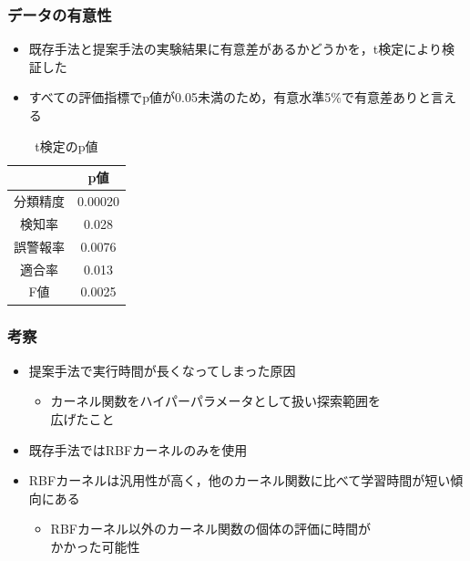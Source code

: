\documentclass[11pt,dvipdfmx,cjk]{beamer}
\begin{document}
\begin{frame}
  \frametitle{データの有意性}
  \begin{itemize}
    \item 既存手法と提案手法の実験結果に有意差があるかどうかを，t検定により検証した
    \item すべての評価指標でp値が0.05未満のため，有意水準5\%で有意差ありと言える
  \end{itemize}
  \begin{table}[b]
    \centering
    \caption{t検定のp値}  %
    \begin{tabular}{|c|c|}  %
        \hline  %
        ~ & p値 \\
        \hline  %
        分類精度 & 0.00020\\
        \hline  %
        検知率  & 0.028\\
        \hline  %
        誤警報率 &0.0076\\
        \hline 
        適合率 &0.013\\
        \hline
        F値 & 0.0025\\
        \hline
    \end{tabular}
  \end{table}
\end{frame}

\begin{frame}
  \frametitle{考察}
  \begin{itemize}
    \item 提案手法で実行時間が長くなってしまった原因
    \begin{itemize}
      \item  カーネル関数をハイパーパラメータとして扱い探索範囲を\\広げたこと
    \end{itemize}
    \item 既存手法ではRBFカーネルのみを使用
    \item RBFカーネルは汎用性が高く，他のカーネル関数に比べて学習時間が短い傾向にある
    \begin{itemize}
      \item RBFカーネル以外のカーネル関数の個体の評価に時間が\\かかった可能性
    \end{itemize}
  \end{itemize}
\end{frame}
\end{document}
